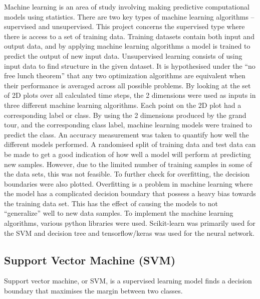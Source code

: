 \documentclass[a4paper,11pt,twoside]{article}
\begin{document}
Machine learning is an area of study involving making predictive computational models using statistics. There are two key types of machine learning algorithms – supervised and unsupervised. This project concerns the supervised type where there is access to a set of training data. Training datasets contain both input and output data, and by applying machine learning algorithms a model is trained to predict the output of new input data. Unsupervised learning consists of using input data to find structure in the given dataset.
\newline
\newline
It is hypothesised under the “no free lunch theorem” that any two optimization algorithms are equivalent when their performance is averaged across all possible problems. By looking at the set of 2D plots over all calculated time steps, the 2 dimensions were used as inputs in three different machine learning algorithms. Each point on the 2D plot had a corresponding label or class. By using the 2 dimensions produced by the grand tour, and the corresponding class label, machine learning models were trained to predict the class. An accuracy measurement was taken to quantify how well the different models performed. A randomised split of training data and test data can be made to get a good indication of how well a model will perform at predicting new samples. However, due to the limited number of training samples in some of the data sets, this was not feasible. To further check for overfitting, the decision boundaries were also plotted.
\newline
\newline
Overfitting is a problem in machine learning where the model has a complicated decision boundary that possess a heavy bias towards the training data set. This has the effect of causing the models to not “generalize” well to new data samples.
\newline
\newline
To implement the machine learning algorithms, various python libraries were used. Scikit-learn was primarily used for the SVM and decision tree and tensorflow/keras was used for the neural network.

\newpage
\subsection{Support Vector Machine (SVM)}

Support vector machine, or SVM, is a supervised learning model finds a decision boundary that maximises the margin between two classes. 
\end{document}
